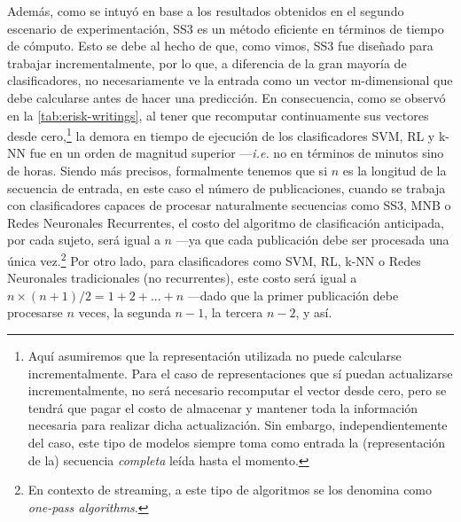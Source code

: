 Además, como se intuyó en base a los resultados obtenidos en el segundo escenario de experimentación, SS3 es un método eficiente en términos de tiempo de cómputo.
Esto se debe al hecho de que, como vimos, SS3 fue diseñado para trabajar incrementalmente, por lo que, a diferencia de la gran mayoría de clasificadores, no necesariamente ve la entrada como un vector m-dimensional que debe calcularse antes de hacer una predicción. En consecuencia, como se observó en la \autoref{tab:erisk-writings}, al tener que recomputar continuamente sus vectores desde cero,\footnote{Aquí asumiremos que la representación utilizada no puede calcularse incrementalmente. Para el caso de representaciones que sí puedan actualizarse incrementalmente, no será necesario recomputar el vector desde cero, pero se tendrá que pagar el costo de almacenar y mantener toda la información necesaria para realizar dicha actualización. Sin embargo, independientemente del caso, este tipo de modelos siempre toma como entrada la (representación de la) secuencia \emph{completa} leída hasta el momento.} la demora en tiempo de ejecución de los clasificadores \ac{SVM}, \ac{RL} y \ac{k-NN} fue en un orden de magnitud superior ---\emph{i.e.} no en términos de minutos sino de horas. %
Siendo más precisos, formalmente tenemos que si $n$ es la longitud de la secuencia de entrada, en este caso el número de publicaciones, cuando se trabaja con clasificadores capaces de procesar naturalmente secuencias como SS3, MNB o Redes Neuronales Recurrentes, el costo del algoritmo de clasificación anticipada, por cada sujeto, será igual a $n$ ---ya que cada publicación debe ser procesada una única vez.\footnote{En contexto de streaming, a este tipo de algoritmos se los denomina como \emph{one-pass algorithms}.}
Por otro lado, para clasificadores como \ac{SVM}, \ac{RL}, \ac{k-NN} o Redes Neuronales tradicionales (no recurrentes), este costo será igual a $n\times(n + 1)/2 = 1+2+... +n$ ---dado que la primer publicación debe procesarse $n$ veces, la segunda $n-1$, la tercera $n-2$, y así.
